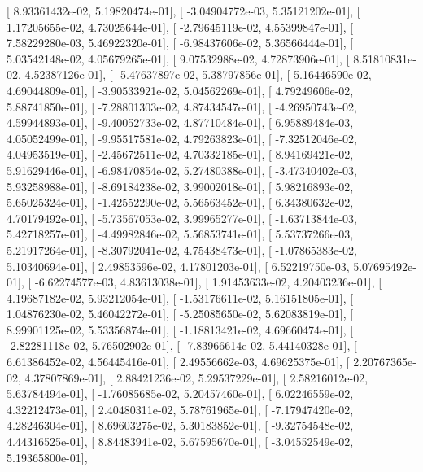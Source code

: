 \documentclass{article}
\begin{document}
       [  8.93361432e-02,   5.19820474e-01],
       [ -3.04904772e-03,   5.35121202e-01],
       [  1.17205655e-02,   4.73025644e-01],
       [ -2.79645119e-02,   4.55399847e-01],
       [  7.58229280e-03,   5.46922320e-01],
       [ -6.98437606e-02,   5.36566444e-01],
       [  5.03542148e-02,   4.05679265e-01],
       [  9.07532988e-02,   4.72873906e-01],
       [  8.51810831e-02,   4.52387126e-01],
       [ -5.47637897e-02,   5.38797856e-01],
       [  5.16446590e-02,   4.69044809e-01],
       [ -3.90533921e-02,   5.04562269e-01],
       [  4.79249606e-02,   5.88741850e-01],
       [ -7.28801303e-02,   4.87434547e-01],
       [ -4.26950743e-02,   4.59944893e-01],
       [ -9.40052733e-02,   4.87710484e-01],
       [  6.95889484e-03,   4.05052499e-01],
       [ -9.95517581e-02,   4.79263823e-01],
       [ -7.32512046e-02,   4.04953519e-01],
       [ -2.45672511e-02,   4.70332185e-01],
       [  8.94169421e-02,   5.91629446e-01],
       [ -6.98470854e-02,   5.27480388e-01],
       [ -3.47340402e-03,   5.93258988e-01],
       [ -8.69184238e-02,   3.99002018e-01],
       [  5.98216893e-02,   5.65025324e-01],
       [ -1.42552290e-02,   5.56563452e-01],
       [  6.34380632e-02,   4.70179492e-01],
       [ -5.73567053e-02,   3.99965277e-01],
       [ -1.63713844e-03,   5.42718257e-01],
       [ -4.49982846e-02,   5.56853741e-01],
       [  5.53737266e-03,   5.21917264e-01],
       [ -8.30792041e-02,   4.75438473e-01],
       [ -1.07865383e-02,   5.10340694e-01],
       [  2.49853596e-02,   4.17801203e-01],
       [  6.52219750e-03,   5.07695492e-01],
       [ -6.62274577e-03,   4.83613038e-01],
       [  1.91453633e-02,   4.20403236e-01],
       [  4.19687182e-02,   5.93212054e-01],
       [ -1.53176611e-02,   5.16151805e-01],
       [  1.04876230e-02,   5.46042272e-01],
       [ -5.25085650e-02,   5.62083819e-01],
       [  8.99901125e-02,   5.53356874e-01],
       [ -1.18813421e-02,   4.69660474e-01],
       [ -2.82281118e-02,   5.76502902e-01],
       [ -7.83966614e-02,   5.44140328e-01],
       [  6.61386452e-02,   4.56445416e-01],
       [  2.49556662e-03,   4.69625375e-01],
       [  2.20767365e-02,   4.37807869e-01],
       [  2.88421236e-02,   5.29537229e-01],
       [  2.58216012e-02,   5.63784494e-01],
       [ -1.76085685e-02,   5.20457460e-01],
       [  6.02246559e-02,   4.32212473e-01],
       [  2.40480311e-02,   5.78761965e-01],
       [ -7.17947420e-02,   4.28246304e-01],
       [  8.69603275e-02,   5.30183852e-01],
       [ -9.32754548e-02,   4.44316525e-01],
       [  8.84483941e-02,   5.67595670e-01],
       [ -3.04552549e-02,   5.19365800e-01],
\end{document}
